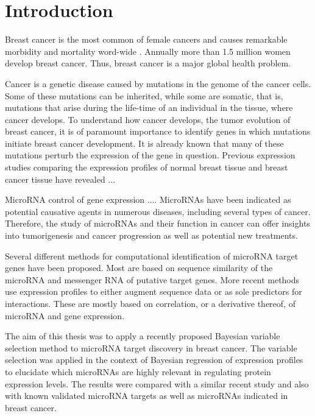 
\section{Introduction}
\thispagestyle{empty}

Breast cancer is the most common of female cancers and causes remarkable
morbidity and mortality word-wide \citep{??}.  Annually more than 1.5 million
women develop breast cancer. Thus, breast cancer is a major global health
problem.

Cancer is a genetic disease caused by mutations in the genome of the cancer
cells. Some of these mutations can be inherited, while some are somatic, that
is, mutations that arise during the life-time of an individual in the tissue,
where cancer develops. To understand how cancer develops, the tumor evolution
of breast cancer, it is of paramount importance to identify genes in which
mutations initiate breast cancer development. It is already known that many of
these mutations perturb the expression of the gene in question. Previous
expression studies comparing the expression profiles of normal breast tissue
and breast cancer tissue have revealed ...

MicroRNA control of gene expression .... MicroRNAs have been indicated as
potential causative agents in numerous diseases, including several types of
cancer. Therefore, the study of microRNAs and their function in cancer can
offer insights into tumorigenesis and cancer progression as well as potential
new treatments.

Several different methods for computational identification of microRNA target
genes have been proposed. Most are based on sequence similarity of the
microRNA and messenger RNA of putative target genes. More recent methods use
expression profiles to either augment sequence data or as sole predictors for
interactions. These are mostly based on correlation, or a derivative thereof,
of microRNA and gene expression.

The aim of this thesis was to apply a recently proposed Bayesian variable
selection method to microRNA target discovery in breast cancer. The variable
selection was applied in the context of Bayesian regression of expression
profiles to elucidate which microRNAs are highly relevant in regulating
protein expression levels. The results were compared with a similar recent
study and also with known validated microRNA targets as well as microRNAs
indicated in breast cancer.
